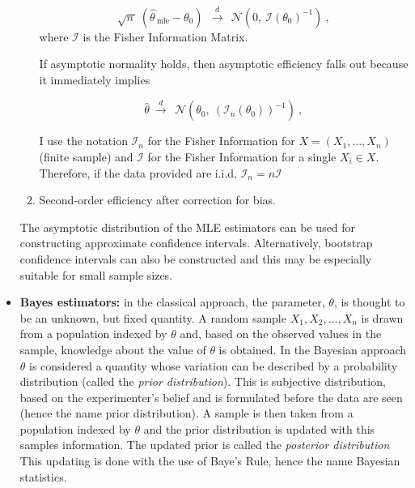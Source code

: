 \begin{itemize}
\begin{enumerate}
        \begin{equation}
            {\sqrt {n\,}}\,\left({\widehat {\theta \,}}_{\text{mle}}-\theta_0\right)\ \ \xrightarrow {d} \ \ {\mathcal {N}}\left(0,\ {\mathcal {I}(\theta_{0})}^{-1}\right)~,
        \end{equation}
        where $\mathcal {I}$ is the Fisher Information Matrix.
        
        If asymptotic normality holds, then asymptotic efficiency falls out because it immediately implies
        
        \begin{equation}
            \hat{\theta} \ \xrightarrow {d} \ \ {\mathcal {N}}\left(\theta_0,\ (\mathcal {I}_{n}(\theta_0))^{-1}\right)~,
        \end{equation}
         
         I use the notation $\mathcal{I}_{n}$ for the Fisher Information for $X = (X_1, \dots, X_n)$ (finite sample) and $\mathcal {I}$ for the Fisher Information for a single $X_i \in X$. Therefore, if the data provided are i.i.d, $\mathcal{I}_{n} = n\mathcal {I}$
         
        \item Second-order efficiency after correction for bias.
    \end{enumerate}
    
    The asymptotic distribution of the MLE estimators can be used for constructing approximate confidence intervals. Alternatively, bootstrap confidence intervals can also be constructed and this may be especially suitable for small sample sizes.
    
    \item \textbf{Bayes estimators:} in the classical approach, the parameter, $\theta$, is thought to be an unknown, but fixed quantity.  A random sample $X_1, X_2, \dots, X_n$ is drawn from a population indexed by $\theta$ and, based on the observed values in the sample, knowledge about the value of $\theta$ is obtained. In the Bayesian approach $\theta$ is considered a quantity whose variation can be described by a probability distribution (called the \textit{prior distribution}). This is subjective distribution, based on the experimenter's belief and is formulated before the data are seen (hence the name prior distribution). A sample is then taken from a population indexed by $\theta$ and the prior distribution is updated with this samples information. The updated prior is called the \textit{posterior distribution} This updating is done with the use of Baye's Rule, hence the name Bayesian statistics.
    

\end{itemize}
